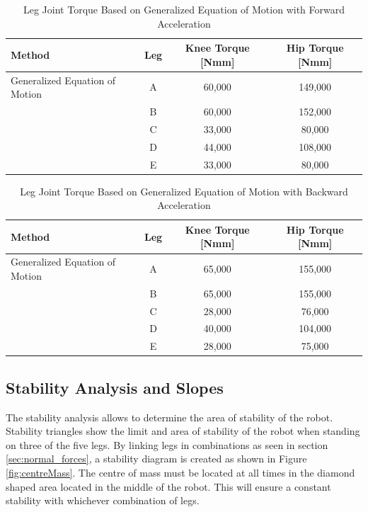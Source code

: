 \begin{table}[H]
    \centering
    \caption{Leg Joint Torque Based on Generalized Equation of Motion with Forward Acceleration}
    \label{tab:torques_Moving_forward}
    \begin{tabular}{l c c c}
        \\ \hline
        \textbf{Method} & \textbf{Leg} & \textbf{Knee Torque [Nmm]} & \textbf{Hip Torque [Nmm]}
        \\ \hline
        Generalized Equation of Motion & A & 60,000 & 149,000
        \\
          & B & 60,000 & 152,000
        \\
         & C & 33,000 & 80,000
        \\
         & D & 44,000 & 108,000
        \\
         & E & 33,000 & 80,000
        \\ \hline
    \end{tabular}
\end{table}

\begin{table}[H]
    \centering
    \caption{Leg Joint Torque Based on Generalized Equation of Motion with Backward Acceleration}
    \label{tab:torques_Moving_backward}
    \begin{tabular}{l c c c}
        \\ \hline
        \textbf{Method} & \textbf{Leg} & \textbf{Knee Torque [Nmm]} & \textbf{Hip Torque [Nmm]}
        \\ \hline
        Generalized Equation of Motion & A & 65,000 & 155,000
        \\
          & B & 65,000 & 155,000
        \\
         & C & 28,000 & 76,000
        \\
         & D & 40,000 & 104,000
        \\
         & E & 28,000 & 75,000
        \\ \hline
    \end{tabular}
\end{table}


\subsection{Stability Analysis and Slopes}
\label{sec:stability}
The stability analysis allows to determine the area of stability of the robot. Stability triangles show the limit and area of stability of the robot when standing on three of the five legs. By linking legs in combinations as seen in section \ref{sec:normal_forces}, a stability diagram is created as shown in Figure \ref{fig:centreMass}. The centre of mass must be located at all times in the diamond shaped area located in the middle of the robot. This will ensure a constant stability with whichever combination of legs.

